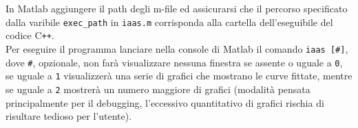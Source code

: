 \documentclass[12pt]{report}
\begin{document}
\noindent In Matlab aggiungere il path degli m-file ed assicurarsi che il percorso specificato dalla varibile \verb|exec_path| in \verb|iaas.m| corrisponda alla cartella dell'eseguibile del codice C\verb|++|.\\
Per eseguire il programma lanciare nella console di Matlab il comando \verb|iaas [#]|, dove \verb|#|, opzionale, non far\`a visualizzare nessuna finestra se assente o uguale a \verb|0|, se uguale a \verb|1| visualizzer\`a una serie di grafici che mostrano le curve fittate, mentre se uguale a \verb|2| mostrer\`a un numero maggiore di grafici (modalit\`a pensata principalmente per il debugging, l'eccessivo quantitativo di grafici rischia di risultare tedioso per l'utente).

\printbibliography
\end{document}
